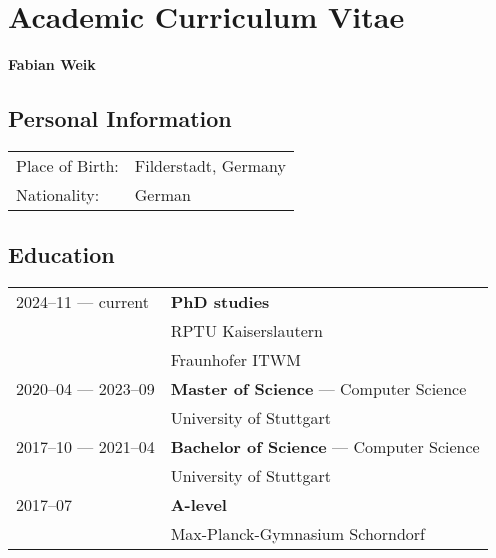 \section*{Academic Curriculum Vitae}

\vspace{5mm}
\large
\textbf{Fabian Weik}
\normalsize

\subsection*{Personal Information}

\begin{tabular}{ll}
  Place of Birth: & Filderstadt, Germany \\[0.2em]
  Nationality: & German
\end{tabular}

\subsection*{Education}

\begin{tabular}{ll}
  2024--11 --- current            & \textbf{PhD studies} \\
                                  & RPTU Kaiserslautern \\
                                  & Fraunhofer ITWM \\[0.3em]
  2020--04 --- 2023--09           & \textbf{Master of Science} --- Computer Science \\
                                  & University of Stuttgart \\[0.3em]
  2017--10 --- 2021--04           & \textbf{Bachelor of Science} --- Computer Science \\
                                  & University of Stuttgart \\[0.3em]
  \phantom{2017--07 ---} 2017--07 & \textbf{A-level} \\
                                  & Max-Planck-Gymnasium Schorndorf
\end{tabular}
